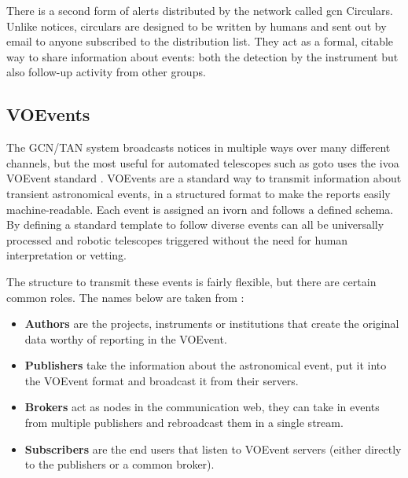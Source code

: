 \begin{colsection}
\begin{colsection}
There is a second form of alerts distributed by the network called \gls{gcn} Circulars. Unlike notices, circulars are designed to be written by humans and sent out by email to anyone subscribed to the distribution list. They act as a formal, citable way to share information about events: both the detection by the instrument but also follow-up activity from other groups.

\end{colsection}


\subsection{VOEvents}
\label{sec:voevents}
\begin{colsection}

The GCN/TAN system broadcasts notices in multiple ways over many different channels, but the most useful for automated telescopes such as \gls{goto} uses the \gls{ivoa} VOEvent standard \citep{voevent}. VOEvents are a standard way to transmit information about transient astronomical events, in a structured format to make the reports easily machine-readable. Each event is assigned an \gls{ivorn} and follows a defined schema. By defining a standard template to follow diverse events can all be universally processed and robotic telescopes triggered without the need for human interpretation or vetting.

The structure to transmit these events is fairly flexible, but there are certain common roles. The names below are taken from \citet{voevent}:

\begin{itemize}
    \item \textbf{Authors} are the projects, instruments or institutions that create the original data worthy of reporting in the VOEvent.
    \item \textbf{Publishers} take the information about the astronomical event, put it into the VOEvent format and broadcast it from their servers.
    \item \textbf{Brokers} act as nodes in the communication web, they can take in events from multiple publishers and rebroadcast them in a single stream.
    \item \textbf{Subscribers} are the end users that listen to VOEvent servers (either directly to the publishers or a common broker).
\end{itemize}


\end{colsection}
\end{colsection}

